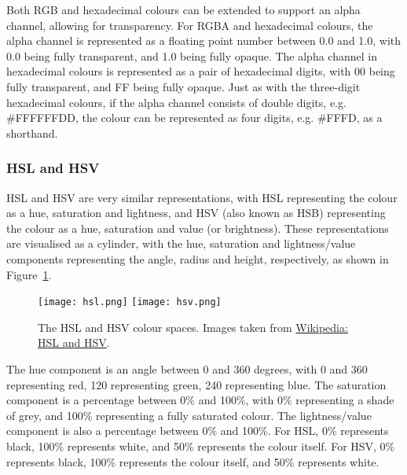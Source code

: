 \documentclass[../main.tex]{subfiles}
\begin{document}
                Both RGB and hexadecimal colours can be extended to support an alpha channel,
                    allowing for transparency.
                For RGBA and hexadecimal colours, the alpha channel is represented as a
                    floating point number between 0.0 and 1.0, with 0.0 being fully transparent,
                    and 1.0 being fully opaque.
                The alpha channel in hexadecimal colours is represented as a pair of
                    hexadecimal digits, with 00 being fully transparent, and FF being fully opaque.
                Just as with the three-digit hexadecimal colours, if the alpha channel consists
                    of double digits, e.g. \#FFFFFFDD, the colour can be represented as four
                    digits, e.g. \#FFFD, as a shorthand.

            \subsubsection{HSL and HSV}
                HSL and HSV are very similar representations, with HSL representing the colour
                    as a hue, saturation and lightness, and HSV (also known as HSB) representing
                    the colour as a hue, saturation and value (or brightness).
                These representations are visualised as a cylinder, with the hue, saturation
                    and lightness/value components representing the angle, radius and height,
                    respectively, as shown in Figure~\ref{fig:hsl}.

                \begin{figure}[H]
                    \centering
                    \texttt{[image: hsl.png]}
                    \texttt{[image: hsv.png]}
                        \caption{The HSL and HSV colour spaces.
                            Images taken from \href{https://en.wikipedia.org/wiki/HSL_and_HSV}{Wikipedia:
                                    HSL and HSV}.
                        }
                        \label{fig:hsl}
                \end{figure}

                The hue component is an angle between 0 and 360 degrees, with 0 and 360
                    representing red, 120 representing green, 240 representing blue.
                The saturation component is a percentage between 0\% and 100\%, with 0\%
                    representing a shade of grey, and 100\% representing a fully saturated colour.
                The lightness/value component is also a percentage between 0\% and 100\%.
                For HSL, 0\% represents black, 100\% represents white, and 50\% represents the
                    colour itself.
                For HSV, 0\% represents black, 100\% represents the colour itself, and 50\%
                    represents white.
\end{document}
